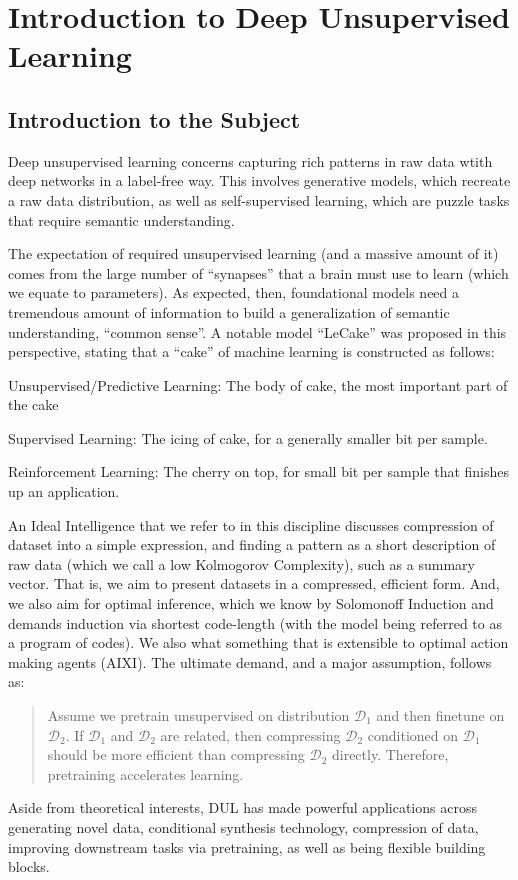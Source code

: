 \chapter{Introduction to Deep Unsupervised Learning}

\section{Introduction to the Subject}
Deep unsupervised learning concerns capturing rich patterns in raw data wtith deep networks in a label-free way.
This involves generative models, which recreate a raw data distribution, as well as self-supervised learning, which are puzzle tasks that require semantic understanding.

The expectation of required unsupervised learning (and a massive amount of it) comes from the large number of ``synapses'' that a brain must use to learn (which we equate to parameters).
As expected, then, foundational models need a tremendous amount of information to build a generalization of semantic understanding, ``common sense''.
A notable model ``LeCake'' was proposed in this perspective, stating that a ``cake'' of machine learning is constructed as follows:
\begin{bindenum}
    \item Unsupervised/Predictive Learning: The body of cake, the most important part of the cake
    \item Supervised Learning: The icing of cake, for a generally smaller bit per sample.
    \item Reinforcement Learning: The cherry on top, for small bit per sample that finishes up an application.
\end{bindenum}

An Ideal Intelligence that we refer to in this discipline discusses compression of dataset into a simple expression, and finding a pattern as a short description of raw data (which we call a low Kolmogorov Complexity), such as a summary vector.
That is, we aim to present datasets in a compressed, efficient form.
And, we also aim for optimal inference, which we know by Solomonoff Induction and demands induction via shortest code-length (with the model being referred to as a program of codes).
We also what something that is extensible to optimal action making agents (AIXI).
The ultimate demand, and a major assumption, follows as:
\begin{quote}
    Assume we pretrain unsupervised on distribution $\mathcal{D}_1$ and then finetune on $\mathcal{D}_2$.
    If $\mathcal{D}_1$ and $\mathcal{D}_2$ are related, then compressing $\mathcal{D}_2$ conditioned on $\mathcal{D}_1$ should be more efficient than compressing $\mathcal{D}_2$ directly.
    Therefore, pretraining accelerates learning.
\end{quote}

Aside from theoretical interests, DUL has made powerful applications across generating novel data, conditional synthesis technology, compression of data, improving downstream tasks via pretraining, as well as being flexible building blocks.
